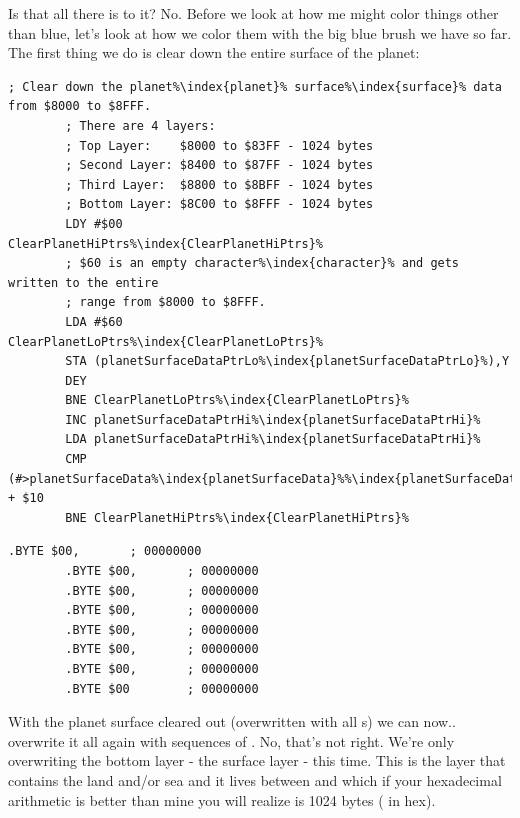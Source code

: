 Is that all there is to it? No. Before we look at how me might color things other than blue, let's look at how we color them
with the big blue brush we have so far. The first thing we do is clear down the entire surface of the planet:

\begin{lstlisting}[escapechar=\%,caption=The surface\index{surface} data is stored from \icode{\$8000} to \icode{\$8FFF}. This code overwrites it all with 
the value \$60\, which is an empty bitmap.]
        ; Clear down the planet%\index{planet}% surface%\index{surface}% data from $8000 to $8FFF.
        ; There are 4 layers:
        ; Top Layer:    $8000 to $83FF - 1024 bytes 
        ; Second Layer: $8400 to $87FF - 1024 bytes 
        ; Third Layer:  $8800 to $8BFF - 1024 bytes 
        ; Bottom Layer: $8C00 to $8FFF - 1024 bytes 
        LDY #$00
ClearPlanetHiPtrs%\index{ClearPlanetHiPtrs}%   
        ; $60 is an empty character%\index{character}% and gets written to the entire
        ; range from $8000 to $8FFF.
        LDA #$60
ClearPlanetLoPtrs%\index{ClearPlanetLoPtrs}%   
        STA (planetSurfaceDataPtrLo%\index{planetSurfaceDataPtrLo}%),Y
        DEY
        BNE ClearPlanetLoPtrs%\index{ClearPlanetLoPtrs}%
        INC planetSurfaceDataPtrHi%\index{planetSurfaceDataPtrHi}%
        LDA planetSurfaceDataPtrHi%\index{planetSurfaceDataPtrHi}%
        CMP (#>planetSurfaceData%\index{planetSurfaceData}%%\index{planetSurfaceData%\index{planetSurfaceData}%}%) + $10
        BNE ClearPlanetHiPtrs%\index{ClearPlanetHiPtrs}%
\end{lstlisting}

\begin{lstlisting}[caption=The empty character\index{character} bit map (all zeroes) used to overwrite the surface\index{surface} before populating it.,escapechar=\%]
        .BYTE $00,       ; 00000000           
        .BYTE $00,       ; 00000000           
        .BYTE $00,       ; 00000000           
        .BYTE $00,       ; 00000000           
        .BYTE $00,       ; 00000000           
        .BYTE $00,       ; 00000000           
        .BYTE $00,       ; 00000000           
        .BYTE $00        ; 00000000           
\end{lstlisting}

With the planet surface cleared out (overwritten with all s) we can now.. overwrite it all again with sequences of
. No, that's not right. We're only overwriting the bottom layer - the surface layer - this time. This is the
layer that contains the land and/or sea and it lives between  and  which if your hexadecimal
arithmetic is better than mine you will realize is 1024 bytes ( in hex).

